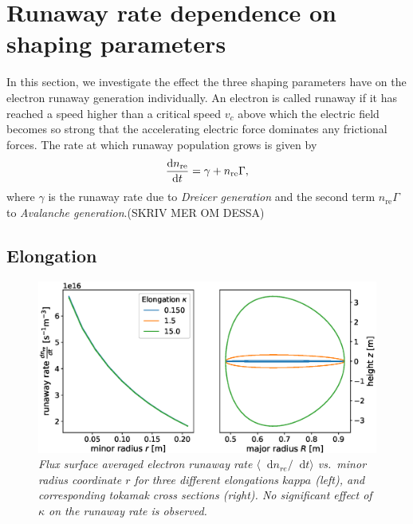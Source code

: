 \documentclass[11pt,a4paper]{article}
\newcommand*\diff{\mathop{}\!\mathrm{d}}
\begin{document}
\section{Runaway rate dependence on shaping parameters}
In this section, we investigate the effect the three shaping parameters have on the electron runaway generation individually.
An electron is called runaway if it has reached a speed higher than a critical speed $v_c$ above which the electric field becomes so strong that the accelerating electric force dominates any frictional forces.
The rate at which runaway population grows is given by
\begin{align*}
    \dv{n_\text{re}}{t}
    =\gamma+n_\text{re}\Gamma,
\end{align*}
where $\gamma$ is the runaway rate due to \textit{Dreicer generation} and the second term $n_\text{re}\Gamma$ to \textit{Avalanche generation}.(SKRIV MER OM DESSA)\\

\subsection{Elongation}


\begin{figure}[H]
    \centering
    \includegraphics[width=\textwidth]{figs/elongation.eps}
    \caption{\textit{Flux surface averaged electron runaway rate $\langle\diff{n}_{re}/\diff{t}\rangle$ vs.\ minor radius coordinate $r$ for three different elongations $kappa$ (left), and corresponding tokamak cross sections (right).
    No significant effect of $\kappa$ on the runaway rate is observed.}}
    \label{fig:elongation}
\end{figure}
\end{document}
